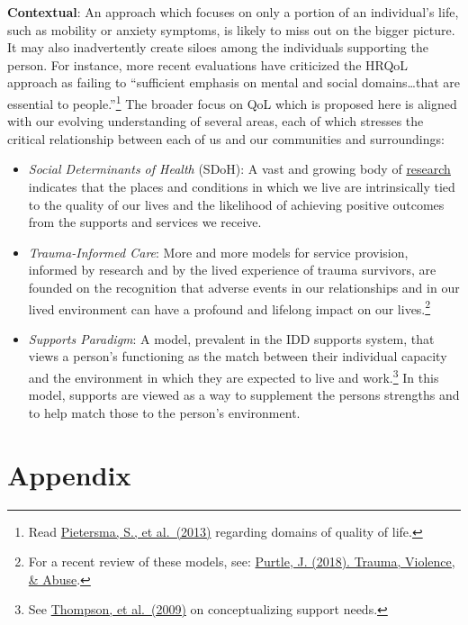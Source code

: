 \documentclass[
]{book}
\providecommand{\tightlist}{%
  \setlength{\itemsep}{0pt}\setlength{\parskip}{0pt}}
\begin{document}
\textbf{Contextual}: An approach which focuses on only a portion of an individual's life, such as mobility or anxiety symptoms, is likely to miss out on the bigger picture. It may also inadvertently create siloes among the individuals supporting the person. For instance, more recent evaluations have criticized the HRQoL approach as failing to ``sufficient emphasis on mental and social domains\ldots that are essential to people.''\footnote{Read \href{https://www.ncbi.nlm.nih.gov/pmc/articles/PMC4031380/}{Pietersma, S., et al.~(2013)} regarding domains of quality of life.} The broader focus on QoL which is proposed here is aligned with our evolving understanding of several areas, each of which stresses the critical relationship between each of us and our communities and surroundings:

\begin{itemize}
\tightlist
\item
  \emph{Social Determinants of Health} (SDoH): A vast and growing body of \href{https://www.cdc.gov/socialdeterminants/research/index.htm}{research} indicates that the places and conditions in which we live are intrinsically tied to the quality of our lives and the likelihood of achieving positive outcomes from the supports and services we receive.
\item
  \emph{Trauma-Informed Care}: More and more models for service provision, informed by research and by the lived experience of trauma survivors, are founded on the recognition that adverse events in our relationships and in our lived environment can have a profound and lifelong impact on our lives.\footnote{For a recent review of these models, see: \href{https://www.ncbi.nlm.nih.gov/pubmed/30079827}{Purtle, J. (2018). Trauma, Violence, \& Abuse}.}
\item
  \emph{Supports Paradigm}: A model, prevalent in the IDD supports system, that views a person's functioning as the match between their individual capacity and the environment in which they are expected to live and work.\footnote{See \href{https://www.ncbi.nlm.nih.gov/pubmed/19368481}{Thompson, et al.~(2009)} on conceptualizing support needs.} In this model, supports are viewed as a way to supplement the persons strengths and to help match those to the person's environment.
\end{itemize}

\hypertarget{appendix}{%
\chapter{Appendix}\label{appendix}}
\end{document}
